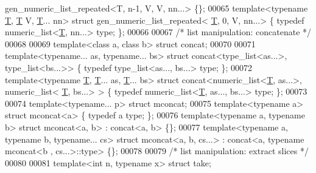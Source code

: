 \begin{DoxyCode}
      gen\_numeric\_list\_repeated<T, n-1, V, V, nn...> \{\};
00065 \textcolor{keyword}{template}<\textcolor{keyword}{typename} \hyperlink{group___sparse_core___module_class_eigen_1_1_triplet}{T}, \hyperlink{group___sparse_core___module_class_eigen_1_1_triplet}{T} V, \hyperlink{group___sparse_core___module_class_eigen_1_1_triplet}{T}... nn>                \textcolor{keyword}{struct }gen\_numeric\_list\_repeated<
      \hyperlink{group___sparse_core___module_class_eigen_1_1_triplet}{T}, 0, V, nn...> \{ \textcolor{keyword}{typedef} numeric\_list<\hyperlink{group___sparse_core___module_class_eigen_1_1_triplet}{T}, nn...> type; \};
00066 
00067 \textcolor{comment}{/* list manipulation: concatenate */}
00068 
00069 \textcolor{keyword}{template}<\textcolor{keyword}{class} a, \textcolor{keyword}{class} b> \textcolor{keyword}{struct }concat;
00070 
00071 \textcolor{keyword}{template}<\textcolor{keyword}{typename}... as, \textcolor{keyword}{typename}... bs> \textcolor{keyword}{struct }concat<type\_list<as...>,       type\_list<bs...>>        \{ \textcolor{keyword}{
      typedef} type\_list<as..., bs...> type; \};
00072 \textcolor{keyword}{template}<\textcolor{keyword}{typename} \hyperlink{group___sparse_core___module_class_eigen_1_1_triplet}{T}, \hyperlink{group___sparse_core___module_class_eigen_1_1_triplet}{T}... as, \hyperlink{group___sparse_core___module_class_eigen_1_1_triplet}{T}... bs>   \textcolor{keyword}{struct }concat<numeric\_list<\hyperlink{group___sparse_core___module_class_eigen_1_1_triplet}{T}, as...>, numeric\_list<
      \hyperlink{group___sparse_core___module_class_eigen_1_1_triplet}{T}, bs...> > \{ \textcolor{keyword}{typedef} numeric\_list<\hyperlink{group___sparse_core___module_class_eigen_1_1_triplet}{T}, as..., bs...> type; \};
00073 
00074 \textcolor{keyword}{template}<\textcolor{keyword}{typename}... p> \textcolor{keyword}{struct }mconcat;
00075 \textcolor{keyword}{template}<\textcolor{keyword}{typename} a>                             \textcolor{keyword}{struct }mconcat<a>           \{ \textcolor{keyword}{typedef} a type; \};
00076 \textcolor{keyword}{template}<\textcolor{keyword}{typename} a, \textcolor{keyword}{typename} b>                 \textcolor{keyword}{struct }mconcat<a, b>        : concat<a, b> \{\};
00077 \textcolor{keyword}{template}<\textcolor{keyword}{typename} a, \textcolor{keyword}{typename} b, \textcolor{keyword}{typename}... cs> \textcolor{keyword}{struct }mconcat<a, b, cs...> : concat<a, typename mconcat<b
      , cs...>::type> \{\};
00078 
00079 \textcolor{comment}{/* list manipulation: extract slices */}
00080 
00081 \textcolor{keyword}{template}<\textcolor{keywordtype}{int} n, \textcolor{keyword}{typename} x> \textcolor{keyword}{struct }take;

\end{DoxyCode}
